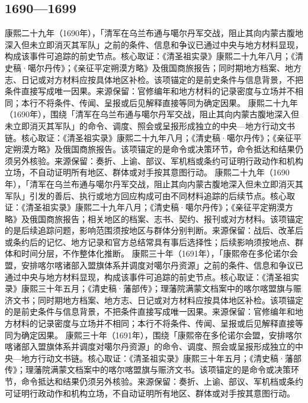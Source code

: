 \subsection{1690—1699}
康熙二十九年（1690年），「清军在乌兰布通与噶尔丹军交战，阻止其向内蒙古腹地深入但未立即消灭其军队」之前的条件、信息和争议已通过中央与地方材料显现，构成该事件可追踪的前史节点。核心取证：《清圣祖实录》康熙二十九年八月；《清史稿·噶尔丹传》；《亲征平定朔漠方略》及俄国商旅报告；同时期地方档案、地方志、日记或对方材料应按具体地区补检。该项锚定的是前史条件与信息背景，不把条件直接写成唯一因果。来源保留：官修编年和地方材料的记录密度与立场并不相同；本行不将条件、传闻、呈报或后见解释直接等同为确定因果。
康熙二十九年（1690年），围绕「清军在乌兰布通与噶尔丹军交战，阻止其向内蒙古腹地深入但未立即消灭其军队」的命令、调度、照会或呈报形成独立的中央—地方行动文书链。核心取证：《清圣祖实录》康熙二十九年八月；《清史稿·噶尔丹传》；《亲征平定朔漠方略》及俄国商旅报告。该项锚定的是命令或决策环节，命令抵达和结果仍须另外核验。来源保留：奏折、上谕、部议、军机档或条约可证明行政动作和机构立场，不自动证明所有地区、群体或对手按其意图行动。
康熙二十九年（1690年），「清军在乌兰布通与噶尔丹军交战，阻止其向内蒙古腹地深入但未立即消灭其军队」引发的善后、执行或地方回应构成可由不同材料追踪的后续节点。核心取证：《清圣祖实录》康熙二十九年八月；《清史稿·噶尔丹传》；《亲征平定朔漠方略》及俄国商旅报告；相关地区的档案、志书、契约、报刊或对方材料。该项锚定的是后续追踪问题，影响范围须按地区与群体分别判断。来源保留：战后、改革后或条约后的记忆、地方记录和官方总结常具有事后选择性；后续影响须按地点、群体和时间分层，不作整体化推断。
康熙三十年（1691年），「康熙帝在多伦诺尔会盟，安排喀尔喀诸部入盟旗体系并调度对噶尔丹资源」之前的条件、信息和争议已通过中央与地方材料显现，构成该事件可追踪的前史节点。核心取证：《清圣祖实录》康熙三十年五月；《清史稿·藩部传》；理藩院满蒙文档案中的喀尔喀盟旗与赈济文书；同时期地方档案、地方志、日记或对方材料应按具体地区补检。该项锚定的是前史条件与信息背景，不把条件直接写成唯一因果。来源保留：官修编年和地方材料的记录密度与立场并不相同；本行不将条件、传闻、呈报或后见解释直接等同为确定因果。
康熙三十年（1691年），围绕「康熙帝在多伦诺尔会盟，安排喀尔喀诸部入盟旗体系并调度对噶尔丹资源」的命令、调度、照会或呈报形成独立的中央—地方行动文书链。核心取证：《清圣祖实录》康熙三十年五月；《清史稿·藩部传》；理藩院满蒙文档案中的喀尔喀盟旗与赈济文书。该项锚定的是命令或决策环节，命令抵达和结果仍须另外核验。来源保留：奏折、上谕、部议、军机档或条约可证明行政动作和机构立场，不自动证明所有地区、群体或对手按其意图行动。
